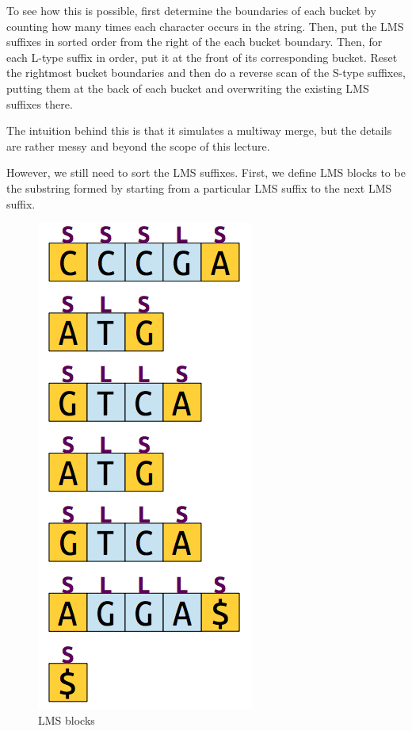 \documentclass[11pt, oneside]{article}
\begin{document}
\newpage

To see how this is possible, first determine the boundaries of each bucket by counting
how many times each character occurs in the string.
Then, put the LMS suffixes in sorted order from the right of the each bucket boundary.
Then, for each L-type suffix in order, put it at the front of its corresponding bucket.
Reset the rightmost bucket boundaries and then do a reverse scan of the S-type suffixes,
putting them at the back of each bucket and overwriting the existing LMS suffixes there.

The intuition behind this is that it simulates a multiway merge, but the details are rather messy and beyond the scope of this lecture.

However, we still need to sort the LMS suffixes. First, we define LMS blocks to be
the substring formed by starting from a particular LMS suffix to the next LMS suffix.


\begin{figure}[h!]
\centering
\includegraphics[scale=0.3]{block}
\caption{LMS blocks}
\end{figure}
\end{document}
